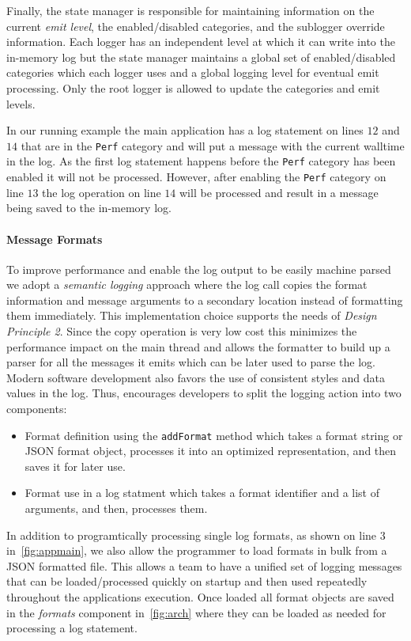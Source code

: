 Finally, the state manager is responsible for maintaining information on the current 
\emph{emit level}, the enabled/disabled categories, and the sublogger override information. 
Each logger has an independent level at which it can write into the in-memory log but 
the state manager maintains a global set of enabled/disabled categories which each logger 
uses and a global logging level for eventual emit processing. Only the root logger is 
allowed to update the categories and emit levels. 

In our running example the main application has a log statement on lines $12$ and $14$ 
that are in the \texttt{Perf} category and will put a message with the current walltime 
in the log. As the first log statement happens before the \texttt{Perf} category has 
been enabled it will not be processed. However, after enabling the \texttt{Perf} category 
on line $13$ the log operation on line $14$ will be processed and result in a message 
being saved to the in-memory log.

\paragraph{Message Formats}
\noindent
To improve performance and enable the log output to be easily machine parsed we 
adopt a \emph{semantic logging} approach where the log call copies the format 
information and message arguments to a secondary location instead of formatting them 
immediately. This implementation choice supports the needs of \emph{Design Principle 2}.
Since the copy operation is very low cost this minimizes the 
performance impact on the main thread and allows the formatter to build up a 
parser for all the messages it emits which can be later used to parse the log. 
Modern software development also favors the use of consistent styles and data 
values in the log. Thus, \projn encourages developers to split the logging 
action into two components:
\begin{itemize}
\item Format definition using the \texttt{addFormat} method which takes a format 
string or JSON format object, processes it into an optimized representation, 
and then saves it for later use.
\item Format use in a log statment which takes a format identifier and a list of 
arguments, and then, processes them.
\end{itemize}

In addition to programtically processing single log formats, as shown on line 3 
in~\autoref{fig:appmain}, we also allow the programmer to load formats in bulk 
from a JSON formatted file. This allows a team to have a unified set of logging 
messages that can be loaded/processed quickly on startup and then used repeatedly 
throughout the applications execution. Once loaded all format objects are saved 
in the \emph{formats} component in~\autoref{fig:arch} where they can be loaded 
as needed for processing a log statement.

